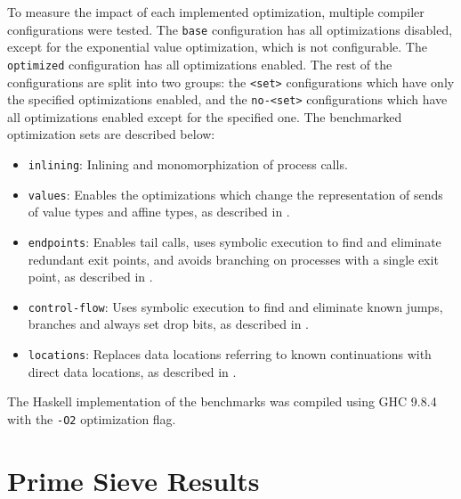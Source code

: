 To measure the impact of each implemented optimization, multiple compiler configurations were tested. The \texttt{base} configuration has all optimizations disabled, except for the exponential value optimization, which is not configurable. The \texttt{optimized} configuration has all optimizations enabled. The rest of the configurations are split into two groups: the \texttt{<set>} configurations which have only the specified optimizations enabled, and the \texttt{no-<set>} configurations which have all optimizations enabled except for the specified one. The benchmarked optimization sets are described below:
\begin{itemize}[noitemsep, topsep=0pt, partopsep=0pt, parsep=0pt, labelindent=0pt]
    \item \texttt{inlining}: Inlining and monomorphization of process calls.
    \item \texttt{values}: Enables the optimizations which change the representation of sends of value types and affine types, as described in .
    \item \texttt{endpoints}: Enables tail calls, uses symbolic execution to find and eliminate redundant exit points, and avoids branching on processes with a single exit point, as described in .
    \item \texttt{control-flow}: Uses symbolic execution to find and eliminate known jumps, branches and always set drop bits, as described in .
    \item \texttt{locations}: Replaces data locations referring to known continuations with direct data locations, as described in .
\end{itemize}

The Haskell implementation of the benchmarks was compiled using GHC 9.8.4 with the \texttt{-O2} optimization flag.

\clearpage
\section{Prime Sieve Results}

